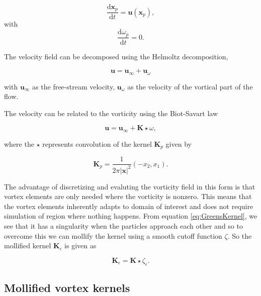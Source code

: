 	\begin{equation}
	\frac{\mathrm{d}\mathbf{x}_p}{\mathrm{d}t} = \mathbf{u}\left(\mathbf{x}_p\right),
	\end{equation}
with
	\begin{equation}
	\frac{\mathrm{d}\omega_p}{\mathrm{d}t} = 0.
	\end{equation}

The velocity field can be decomposed using the Helmoltz decomposition,

	\begin{equation}
	\mathbf{u} = \mathbf{u}_{\infty} + \mathbf{u}_{\omega}%
	\end{equation}
	
with $\mathbf{u}_{\infty}$ as the free-stream velocity, $\mathbf{u}_{\omega}$ as the velocity of the vortical part of the flow.

The velocity can be related to the vorticity using the Biot-Savart law

	\begin{equation}
	\mathbf{u} = \mathbf{u}_{\infty} + \mathbf{K}\star\omega,
	\end{equation}
	
where the $\star$ represents convolution of the kernel $\mathbf{K}_p$ given by

	\begin{equation}
	\mathbf{K}_p = \frac{1}{2\pi\left|\mathbf{x}\right|^2}\left(-x_2,x_1\right).
	\label{eq:GreensKernel}
	\end{equation}

The advantage of discretizing and evaluting the vorticity field in this form is that vortex elements are only needed where the vorticity is nonzero. This means that the vortex elements inherently adapts to domain of interest and does not require simulation of region where nothing happens. From equation \ref{eq:GreensKernel}, we see that it has a singularity when the particles approach each other and so to overcome this we can mollify the kernel using a smooth cutoff function $\zeta$. So the mollified kernel $\mathbf{K}_{\epsilon}$ is given as 

	\begin{equation}
	\mathbf{K}_{\epsilon} = \mathbf{K} \star \zeta_{\epsilon}.
	\end{equation}


\subsection{Mollified vortex kernels}

